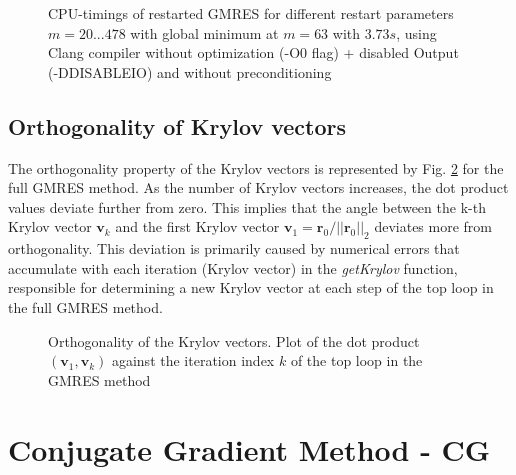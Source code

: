 \documentclass[11pt,a4paper]{article}
\newcommand{\refFig}[1]{Fig. \ref{#1}}
\begin{document}
%
\begin{figure}[!htbp]
	\centering
	\hspace*{0.8cm}
	\leavevmode
	\resizebox{1.0\width}{!}{}
	\caption{CPU-timings of restarted GMRES for different restart parameters $m = {20...478} $ with global minimum at $m = 63$ with $3.73 s$, using Clang compiler without optimization (-O0 flag) + disabled Output (-DDISABLEIO) and without preconditioning}
	\label{fig::Timings}
\end{figure}
%
\subsection{Orthogonality of Krylov vectors}
The orthogonality property of the Krylov vectors is represented by \refFig{fig::DotP} for the full GMRES method. As the number of Krylov vectors increases, the dot product values deviate further from zero. This implies that the angle between the k-th Krylov vector $\mathbf{v}_k$ and the first Krylov vector $\mathbf{v}_1 = \mathbf{r}_0 / ||\mathbf{r}_0||_2$ deviates more from orthogonality. This deviation is primarily caused by numerical errors that accumulate with each iteration (Krylov vector) in the \textit{getKrylov} function, responsible for determining a new Krylov vector at each step of the top loop in the full GMRES method.
%
\begin{figure}[!htbp]
	\centering
	\hspace*{0.8cm}
	\leavevmode
	\resizebox{0.9\width}{!}{}
	\caption{Orthogonality of the Krylov vectors. Plot of the dot product $(\mathbf{v}_1, \mathbf{v}_k)$ against the iteration index $k$ of the top loop in the GMRES method}
	\label{fig::DotP}
\end{figure}
%
\newpage
\section{Conjugate Gradient Method - CG}
\label{chapter:CG}
\end{document}
